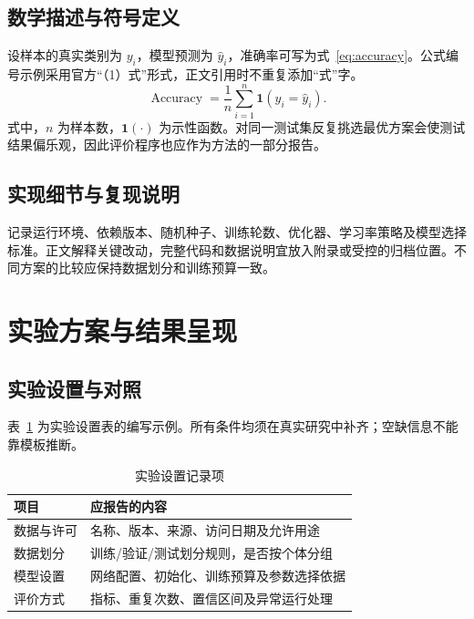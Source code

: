 \subsection{数学描述与符号定义}
设样本的真实类别为 $y_i$，模型预测为 $\hat{y}_i$，准确率可写为式~\eqref{eq:accuracy}。公式编号示例采用官方“（1）式”形式，正文引用时不重复添加“式”字。
\begin{equation}\label{eq:accuracy}
\operatorname{Accuracy}=\frac{1}{n}\sum_{i=1}^{n}\mathbf{1}(y_i=\hat{y}_i).
\end{equation}
式中，$n$ 为样本数，$\mathbf{1}(\cdot)$ 为示性函数。对同一测试集反复挑选最优方案会使测试结果偏乐观，因此评价程序也应作为方法的一部分报告。
\subsection{实现细节与复现说明}
记录运行环境、依赖版本、随机种子、训练轮数、优化器、学习率策略及模型选择标准。正文解释关键改动，完整代码和数据说明宜放入附录或受控的归档位置。不同方案的比较应保持数据划分和训练预算一致。
\section{实验方案与结果呈现}
\subsection{实验设置与对照}
表~\ref{tab:protocol} 为实验设置表的编写示例。所有条件均须在真实研究中补齐；空缺信息不能靠模板推断。
\begin{table}[htbp]\centering\caption{实验设置记录项}\label{tab:protocol}
\begin{tabularx}{\linewidth}{lX}\toprule 项目 & 应报告的内容\\\midrule
数据与许可 & 名称、版本、来源、访问日期及允许用途\\
数据划分 & 训练/验证/测试划分规则，是否按个体分组\\
模型设置 & 网络配置、初始化、训练预算及参数选择依据\\
评价方式 & 指标、重复次数、置信区间及异常运行处理\\\bottomrule\end{tabularx}
\end{table}
